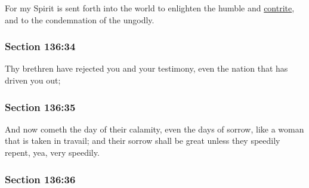 		For my Spirit is sent forth into the world to enlighten the humble and \hyperref[CONTRITE]{contrite}, and to the condemnation of the ungodly.


	\subsubsection{Section 136:34} %
		\label{DC136-34}

		Thy brethren have rejected you and your testimony, even the nation that has driven you out;


	\subsubsection{Section 136:35} %
		\label{DC136-35}

		And now cometh the day of their calamity, even the days of sorrow, like a woman that is taken in travail; and their sorrow shall be great unless they speedily repent, yea, very speedily.


	\subsubsection{Section 136:36} %
		\label{DC136-36}

